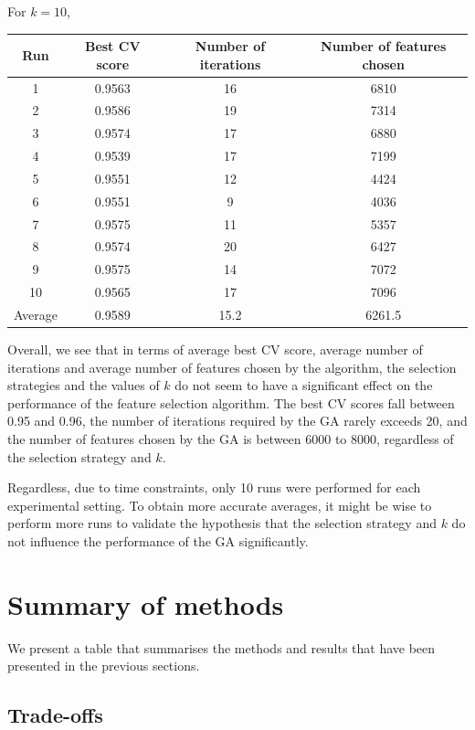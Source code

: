 \documentclass[12pt, twoside, a4paper]{report}
\begin{document}
For $k=10$,
\begin{center}
    \begin{tabular}{| c | c | c | c | } \hline
    Run & Best CV score & Number of iterations & Number of features chosen \\ \hline \hline
    1 & 0.9563 & 16 & 6810 \\ \hline
	2 & 0.9586 & 19 & 7314 \\ \hline
	3 & 0.9574 & 17 & 6880 \\ \hline
	4 & 0.9539 & 17 & 7199 \\ \hline
	5 & 0.9551 & 12 & 4424 \\ \hline
	6 & 0.9551 & 9 & 4036 \\ \hline
	7 & 0.9575 & 11 & 5357 \\ \hline
	8 & 0.9574 & 20 & 6427 \\ \hline
	9 & 0.9575 & 14 & 7072 \\ \hline
	10 & 0.9565 & 17 & 7096 \\ \hline
	Average & 0.9589 & 15.2 & 6261.5 \\ \hline
    \end{tabular}
\end{center}


Overall, we see that in terms of average best CV score, average number of iterations and average number of features chosen by the algorithm, the selection strategies and the values of $k$ do not seem to have a significant effect on the performance of the feature selection algorithm. The best CV scores fall between 0.95 and 0.96, the number of iterations required by the GA rarely exceeds 20, and the number of features chosen by the GA is between 6000 to 8000, regardless of the selection strategy and $k$.

Regardless, due to time constraints, only 10 runs were performed for each experimental setting. To obtain more accurate averages, it might be wise to perform more runs to validate the hypothesis that the selection strategy and $k$ do not influence the performance of the GA significantly.

\section{Summary of methods}

We present a table that summarises the methods and results that have been presented in the previous sections.

\subsection{Trade-offs}
\end{document}
